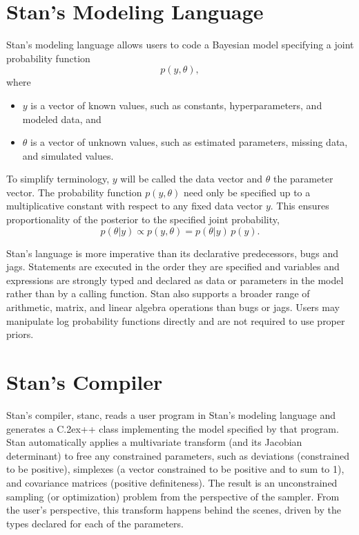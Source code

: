 \documentclass[10pt]{report}
\newcommand{\Stan}{Stan\xspace}
\newcommand{\stanc}{{\ttfamily stanc}\xspace}
\newcommand*{\Cpp}{C\raise.2ex\hbox{\footnotesize ++}\xspace} %
\newcommand{\acronym}[1]{{\sc #1}\xspace}
\newcommand{\BUGS}{\acronym{bugs}}
\newcommand{\JAGS}{\acronym{jags}}
\begin{document}
\section{\Stan's Modeling Language}

\noindent
\Stan's modeling language allows users to code a Bayesian model
specifying a joint probability function
\[
p(y,\theta),
\]
where 
\begin{itemize}
\item
  $y$ is a vector of known values, such as 
  constants, hyperparameters, and modeled data, and
\item
 $\theta$ is a vector of unknown values, such as estimated parameters,
  missing data, and simulated values.
\end{itemize}
%
To simplify terminology, $y$ will be called the data vector and
$\theta$ the parameter vector.  The probability function $p(y,\theta)$
need only be specified up to a multiplicative constant with respect to
any fixed data vector $y$.  This ensures proportionality of the
posterior to the specified joint probability,
\[
p(\theta|y) \propto p(y,\theta) = p(\theta|y) \, p(y).
\]

Stan's language is more imperative than its declarative 
predecessors, \BUGS and \JAGS.  Statements are executed in the order 
they are specified and variables and expressions are strongly typed 
and declared as data or parameters in the model rather than by a 
calling function.  Stan also supports a broader range of arithmetic, 
matrix, and linear algebra operations than \BUGS or \JAGS.  Users may 
manipulate log probability functions directly and are not required 
to use proper priors.

\section{\Stan's Compiler}

\Stan's compiler, \stanc, reads a user program in \Stan's modeling
language and generates a \Cpp class implementing the model specified
by that program.  \Stan automatically applies a multivariate transform
(and its Jacobian determinant) to free any constrained parameters,
such as deviations (constrained to be positive), simplexes (a vector
constrained to be positive and to sum to 1), and covariance matrices
(positive definiteness).  The result is an unconstrained sampling (or
optimization) problem from the perspective of the sampler.  From the
user's perspective, this transform happens behind the scenes, driven
by the types declared for each of the parameters.
\end{document}
